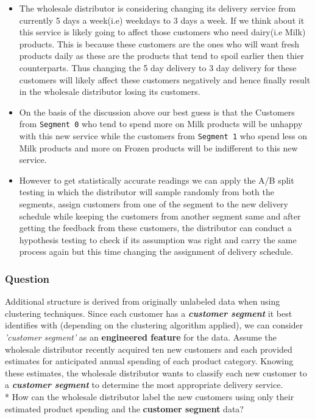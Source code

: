 \documentclass[11pt]{article}
\providecommand{\tightlist}{%
      \setlength{\itemsep}{0pt}\setlength{\parskip}{0pt}}
\begin{document}
\begin{itemize}
\tightlist
\item
  The wholesale distributor is considering changing its delivery service
  from currently 5 days a week(i.e) weekdays to 3 days a week. If we
  think about it this service is likely going to affect those customers
  who need dairy(i.e Milk) products. This is because these customers are
  the ones who will want fresh products daily as these are the products
  that tend to spoil earlier then thier counterparts. Thus changing the
  5 day delivery to 3 day delivery for these customers will likely
  affect these customers negatively and hence finally result in the
  wholesale distributor losing its customers.
\item
  On the basis of the discussion above our best guess is that the
  Customers from \texttt{Segment\ 0} who tend to spend more on Milk
  products will be unhappy with this new service while the customers
  from \texttt{Segment\ 1} who spend less on Milk products and more on
  Frozen products will be indifferent to this new service.
\item
  However to get statistically accurate readings we can apply the A/B
  split testing in which the distributor will sample randomly from both
  the segments, assign customers from one of the segment to the new
  delivery schedule while keeping the customers from another segment
  same and after getting the feedback from these customers, the
  distributor can conduct a hypothesis testing to check if its
  assumption was right and carry the same process again but this time
  changing the assignment of delivery schedule.
\end{itemize}

    \subsubsection{Question}\label{question}

Additional structure is derived from originally unlabeled data when
using clustering techniques. Since each customer has a
\textbf{\emph{customer segment}} it best identifies with (depending on
the clustering algorithm applied), we can consider \emph{'customer
segment'} as an \textbf{engineered feature} for the data. Assume the
wholesale distributor recently acquired ten new customers and each
provided estimates for anticipated annual spending of each product
category. Knowing these estimates, the wholesale distributor wants to
classify each new customer to a \textbf{\emph{customer segment}} to
determine the most appropriate delivery service.\\
* How can the wholesale distributor label the new customers using only
their estimated product spending and the \textbf{customer segment} data?
\end{document}
